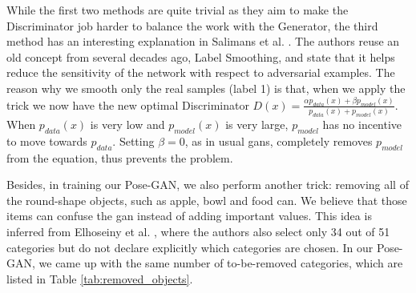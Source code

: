 While the first two methods are quite trivial as they aim to make the Discriminator job
harder to balance the work with the Generator, the third method has an interesting
explanation in Salimans et al. \cite{saliman}. The authors reuse an old concept from
several decades ago, Label Smoothing, and state that it helps reduce the sensitivity of
the network with respect to adversarial examples. The reason why we smooth only the real
samples (label 1) is that, when we apply the trick we now have the new optimal
Discriminator $D(x) = \frac{\alpha p_{data}(x) + \beta p_{model}(x)}{p_{data}(x) +
p_{model}(x)}$. When $p_{data}(x)$ is very low and $p_{model}(x)$ is very large,
$p_{model}$ has no incentive to move towards $p_{data}$. Setting $\beta = 0$, as in usual
\acrshort{gan}s, completely removes $p_{model}$ from the equation, thus prevents the
problem.

Besides, in training our Pose-GAN, we also perform another trick: removing all of the
round-shape objects, such as apple, bowl and food can. We believe that those items can
confuse the \acrshort{gan} instead of adding important values. This idea is inferred from
Elhoseiny et al. \cite{elhoseiny}, where the authors also select only 34 out of 51
categories but do not declare explicitly which categories are chosen. In our
Pose-GAN, we came up with the same number of to-be-removed categories, which are listed in
Table \ref{tab:removed_objects}.

